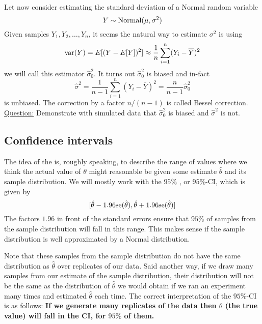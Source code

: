 \begin{example}
Let now consider estimating the standard deviation of a Normal random variable
\begin{equation*}
Y \sim {\rm Normal}(\mu,\sigma^2)
\end{equation*}
Given samples $Y_1,Y_2,\dots,Y_n$, it seems the natural way to estimate $\sigma^2$ is using
\begin{equation*}
{\rm var}(Y) = E[(Y-E[Y])^2] \approx \frac{1}{n}\sum_{i=1}^n(Y_i-\overline{Y})^2
\end{equation*}
we will call this estimator $\hat{\sigma}_0^2$. It turns out $\hat{\sigma}_0^2$ is biased and in-fact 
\begin{equation*}
\hat{\sigma}^2 = \frac{1}{n-1}\sum_{i=1}^n(Y_i-\overline{Y})^2 = \frac{n}{n-1}\hat{\sigma}_0^2
\end{equation*}
is unbiased. The correction by a factor $n/(n-1)$ is called Bessel correction. \\

\noindent
\underline{Question:} Demonstrate with simulated data that $\hat{\sigma}_0^2$ is biased and $\hat{\sigma}^2$ is not. 


\end{example}






\subsection{Confidence intervals}


The idea of the  is, roughly speaking, to describe the range of values where we think the actual value of $\theta$ might reasonable be given some estimate $\hat{\theta}$ and its sample distribution. We will mostly work with the $95\%$ , or $95\%$-CI, which is given by 
\begin{equation}\label{eq:95CI}
[\hat{\theta} - 1.96{\rm se}(\hat{\theta}), \hat{\theta} + 1.96{\rm se}(\hat{\theta})]
\end{equation}
The factors $1.96$ in front of the standard errors ensure that $95\%$ of samples from the sample distribution will fall in this range. 
This makes sense if the sample distribution is well approximated by a Normal distribution. 


Note that these samples from the sample distribution do not have the same distribution as $\hat{\theta}$ over replicates of our data. Said another way, if we draw many samples from our estimate of the sample distribution, their distribution will not be the same as the distribution of $\hat{\theta}$ we would obtain if we ran an experiment many times and estimated $\hat{\theta}$ each time. The correct interpretation of the $95\%$-CI is as follows: {\bf If we generate many replicates of the data then $\theta$ (the true value) will fall in the CI, for $95\%$ of them.} 

